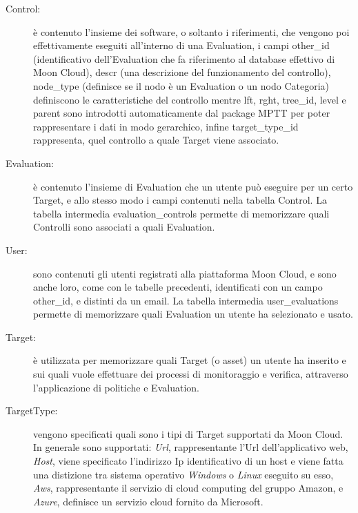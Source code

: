 \begin{description}
    \item[Control:] è contenuto l'insieme dei software, o soltanto i riferimenti, che vengono poi effettivamente eseguiti all'interno 
    di una Evaluation, i campi other\_id (identificativo dell'Evaluation che fa riferimento al database effettivo di Moon Cloud), 
    descr (una descrizione del funzionamento del controllo), node\_type (definisce se il nodo è un Evaluation o un nodo Categoria) 
    definiscono le caratteristiche del controllo mentre lft, rght, tree\_id, level e parent sono introdotti 
    automaticamente dal package MPTT per poter rappresentare i dati in modo gerarchico, infine target\_type\_id rappresenta, quel 
    controllo a quale Target viene associato.
    \item[Evaluation:] è contenuto l'insieme di Evaluation che un utente può eseguire per un certo Target, e allo stesso modo 
    i campi contenuti nella tabella Control. La tabella intermedia evaluation\_controls permette di memorizzare quali Controlli 
    sono associati a quali Evaluation.
    \item[User:] sono contenuti gli utenti registrati alla piattaforma Moon Cloud, e sono anche loro, come con le tabelle precedenti, 
    identificati con un campo other\_id, e distinti da un email. La tabella intermedia user\_evaluations permette di memorizzare 
    quali Evaluation un utente ha selezionato e usato.
    \item[Target:] è utilizzata per memorizzare quali Target (o asset) un utente ha inserito e sui quali vuole effettuare dei processi 
    di monitoraggio e verifica, attraverso l'applicazione di politiche e Evaluation.
    \item[TargetType:] vengono specificati quali sono i tipi di Target supportati da Moon Cloud. In generale sono supportati: \textit{Url}, 
    rappresentante l'Url dell'applicativo web, \textit{Host}, viene specificato l'indirizzo Ip identificativo di un host e viene fatta una 
    distizione tra sistema operativo \textit{Windows} o \textit{Linux} eseguito su esso, \textit{Aws}, rappresentante il servizio di cloud computing del 
    gruppo Amazon, e \textit{Azure}, definisce un servizio cloud fornito da Microsoft.
\end{description}
